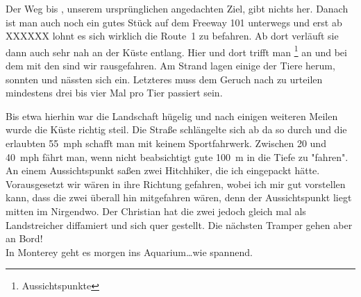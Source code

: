 Der Weg bis , unserem ursprünglichen angedachten Ziel, gibt nichts her.
Danach ist man auch noch ein gutes Stück auf dem Freeway 101 unterwegs und erst ab XXXXXX lohnt es sich wirklich die Route~1 zu befahren.
Ab dort verläuft sie dann auch sehr nah an der Küste entlang.
Hier und dort trifft man \footnote{Aussichtspunkte} an und bei dem mit den  sind wir rausgefahren.
Am Strand lagen einige der Tiere herum, sonnten und nässten sich ein.
Letzteres muss dem Geruch nach zu urteilen mindestens drei bis vier Mal pro Tier passiert sein.

\newpage
\thispagestyle{empty}
\newpage


Bis etwa hierhin war die Landschaft hügelig und nach einigen weiteren Meilen wurde die Küste richtig steil.
Die Straße schlängelte sich ab da so durch und die erlaubten 55~mph schafft man mit keinem Sportfahrwerk.
Zwischen 20 und 40~mph fährt man, wenn nicht beabsichtigt gute 100~m in die Tiefe zu "fahren".\\

An einem Aussichtspunkt saßen zwei Hitchhiker, die ich eingepackt hätte.
Vorausgesetzt wir wären in ihre Richtung gefahren, wobei ich mir gut vorstellen kann, dass die zwei überall hin mitgefahren wären, denn der Aussichtspunkt liegt mitten im Nirgendwo.
Der Christian hat die zwei jedoch gleich mal als Landstreicher diffamiert und sich quer gestellt.
Die nächsten Tramper gehen aber an Bord!\\

In Monterey geht es morgen ins Aquarium\dots wie spannend.
